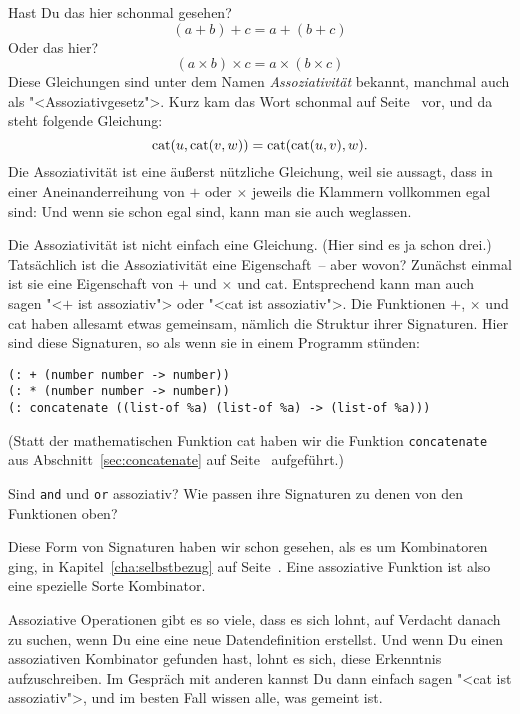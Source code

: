 Hast Du das hier schonmal gesehen?
%
\begin{displaymath}
  (a + b) + c = a + (b + c)
\end{displaymath}
%
Oder das hier?
%
\begin{displaymath}
  (a \times b) \times c = a \times (b \times c)
\end{displaymath}
%
Diese Gleichungen sind unter dem Namen
\textit{Assoziativität} bekannt, manchmal auch
als "<Assoziativgesetz">.  Kurz kam das Wort schonmal auf
Seite~\pageref{page:assoziativitaet} vor, und da steht folgende Gleichung:
%
\begin{displaymath}
  {\rm cat}(u,{\rm cat}(v,w))  = {\rm cat}({\rm cat}(u,v),w).
\end{displaymath}
%
Die Assoziativität ist eine äußerst nützliche Gleichung, weil sie
aussagt, dass in einer Aneinanderreihung von $+$ oder $\times$ jeweils
die Klammern vollkommen egal sind: Und wenn sie schon egal sind, kann
man sie auch weglassen.

Die Assoziativität ist nicht einfach eine Gleichung.  (Hier sind es ja
schon drei.)  Tatsächlich ist die Assoziativität eine Eigenschaft~--
aber wovon?  Zunächst einmal ist sie eine Eigenschaft von $+$ und
$\times$ und cat.  Entsprechend kann man auch sagen "<$+$ ist
assoziativ"> oder "<cat ist assoziativ">.  Die Funktionen $+$,
$\times$ und cat haben allesamt etwas gemeinsam, nämlich die Struktur
ihrer Signaturen.  Hier sind diese Signaturen, so als wenn sie in
einem Programm stünden:
%
\begin{lstlisting}
(: + (number number -> number))
(: * (number number -> number))
(: concatenate ((list-of %a) (list-of %a) -> (list-of %a)))
\end{lstlisting}
%
(Statt der mathematischen Funktion cat haben wir die Funktion
\lstinline{concatenate} aus Abschnitt~\ref{sec:concatenate} auf
Seite~\pageref{sec:concatenate} aufgeführt.)
%
\begin{aufgabeinline}
  Sind \lstinline{and} und \lstinline{or} assoziativ?  Wie passen ihre
  Signaturen zu denen von den Funktionen oben?
\end{aufgabeinline}
%
Diese Form von Signaturen haben wir schon gesehen, als es um
Kombinatoren ging, in Kapitel~\ref{cha:selbstbezug} auf
Seite~\pageref{cha:selbstbezug}.  Eine assoziative Funktion ist also
eine spezielle Sorte Kombinator.

Assoziative Operationen gibt es so viele, dass es sich lohnt, auf
Verdacht danach zu suchen, wenn Du eine eine neue Datendefinition
erstellst.  Und wenn Du einen assoziativen Kombinator gefunden hast,
lohnt es sich, diese Erkenntnis aufzuschreiben.  Im Gespräch mit
anderen kannst Du dann einfach sagen "<cat ist assoziativ">, und im
besten Fall wissen alle, was gemeint ist.

